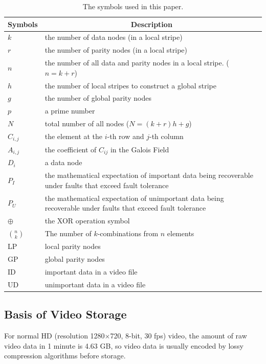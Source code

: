 \documentclass[sigconf]{acmart}
\begin{document}
\begin{table}[]\footnotesize
\caption{The symbols used in this paper.}\label{parameter}
\centering
\begin{tabular}{|p{0.8cm}<{\centering}|p{6.4cm}|}
\hline
Symbols & \multicolumn{1}{c|}{Description} \\ \hline \hline
$k$ & the number of data nodes (in a local stripe) \\ \hline
$r$ & the number of parity nodes (in a local stripe) \\ \hline
$n$ & the number of all data and parity nodes in a local stripe. ($n=k+r$) \\ \hline
$h$ & the number of local stripes to construct a global stripe \\ \hline
$g$ & the number of global parity nodes \\ \hline
$p$ & a prime number \\ \hline
$N$ & total number of all nodes ($N=(k+r)h+g$) \\ \hline
$C_{i,j}$ & the element at the $i$-th row and $j$-th column \\ \hline
$A_{i,j}$ &  the coefficient of $C_{ij}$ in the Galois Field \\ \hline
$D_i$ & a data node \\ \hline
$P_{I}$ & the mathematical expectation of important data being recoverable under faults that exceed fault tolerance \\ \hline
$P_{U}$ & the mathematical expectation of unimportant data being recoverable under faults that exceed fault tolerance \\ \hline
$\oplus$ & the XOR operation symbol \\ \hline
$\binom{n}{k}$ & The number of $k$-combinations from $n$ elements\\ \hline
LP & local parity nodes \\ \hline
GP & global parity nodes \\ \hline
ID & important data in a video file \\ \hline
UD & unimportant data in a video file \\ \hline
\end{tabular}
\vspace{-3mm}
\end{table}


\subsection{Basis of Video Storage}\label{video storage}
For normal HD (resolution 1280$\times$720, 8-bit, 30 fps) video, the amount of raw video data in 1 minute is 4.63 GB, so video data is usually encoded by lossy compression algorithms before storage.
\end{document}
